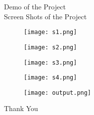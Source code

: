 \documentclass{beamer}
\begin{document}
\begin{frame}{Demo of the Project \\Screen Shots of the Project}
\begin{figure}[htbp]
\centerline{\texttt{[image: s1.png]}}
\end{figure}
\end{frame}
\begin{frame}
\begin{figure}[htbp]
\centerline{\texttt{[image: s2.png]}}
\end{figure}
\end{frame}
\begin{frame}
\begin{figure}[htbp]
\centerline{\texttt{[image: s3.png]}}
\end{figure}
\end{frame}
\begin{frame}
\begin{figure}[htbp]
\centerline{\texttt{[image: s4.png]}}
\end{figure}
\end{frame}
\begin{frame}
\begin{figure}[htbp]
\centerline{\texttt{[image: output.png]}}
\end{figure}
\end{frame}
\begin{frame}
\begin{center}
\Huge{Thank You}
\end{center}
\end{frame}
\end{document}
